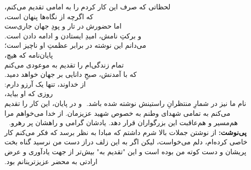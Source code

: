 ‫\noindent لحظاتی که صرف این کار کردم را به امامی تقدیم می‌کنم،\\
‫که اگرچه از نگاه‌ها پنهان است،\\
‫اما حضورش در تار و پودِ جهان جاری‌ست\\
‫و برکتِ نامش، امیدِ ایستادن و ادامه دادن است.\\[0.3cm]
‫\noindent می‌دانم این نوشته در برابر عظمتِ او ناچیز است؛\\
‫پایان‌نامه که هیچ،\\
‫تمام زندگی‌ام را تقدیم به موعودی می‌کنم\\
‫که با آمدنش، صبحِ دانایی بر جهان خواهد دمید.\\[0.3cm]
‫\noindent از خداوند، تنها یک آرزو دارم:\\
‫روزی که او بیاید،\\
‫نام ما نیز در شمارِ منتظرانِ راستینش نوشته شده باشد.
‫
‫و در پایان، این کار را تقدیم می‌کنم به تمامی شهدای وطنم به خصوص شهید عزیزمان. از خدا می‌خواهم مرا هم‌مسیر و هم‌عاقبت این بزرگواران قرار دهد. یادشان گرامی و راهشان پر رهرو.
‫
‫
‫\textbf{پی‌نوشت:} از نوشتن جملات بالا شرم داشتم که مبادا به نظر برسد که فکر می‌کنم کار خاصی کرده‌ام، دلم می‌خواست، لیکن اگر به این زلف دراز دست من نرسید گناه بخت پریشان و دست کوته من بوده است و این "تقدیم به" بیش‌تر از جهت یادآوری و عرض ارادتی به محضر عزیزترینانم بود.